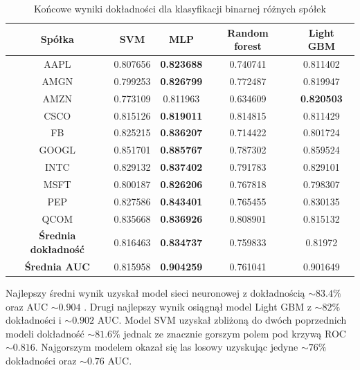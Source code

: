 \documentclass[a4paper, twoside, 11pt, openright]{article}
\begin{document}
 \begin{table}[H]
    \centering
    \begin{tabular}{|c|c|c|c|c|}
    \hline
        \textbf{Spółka} & \textbf{SVM} &  \textbf{MLP}  &  \textbf{Random forest}  &  \textbf{Light GBM} \\ \hline
AAPL   &  0.807656 & \textbf{0.823688}  & 0.740741 & 0.811402\\ \hline
AMGN   &  0.799253 &  \textbf{0.826799} &0.772487 &  0.819947 \\ \hline
AMZN   &  0.773109 & 0.811963 & 0.634609 & \textbf{0.820503} \\ \hline
CSCO   &  0.815126 &  \textbf{0.819011} & 0.814815 &  0.811429 \\ \hline
FB     &  0.825215 & \textbf{0.836207} & 0.714422 & 0.801724 \\ \hline
GOOGL  &  0.851701 &  \textbf{0.885767} & 0.787302 & 0.859524 \\ \hline
INTC   &  0.829132 & \textbf{0.837402}  & 0.791783 & 0.829101 \\ \hline
MSFT   &  0.800187 &   \textbf{0.826206} & 0.767818 &  0.798307\\ \hline
PEP    &  0.827586 & \textbf{0.843401}  & 0.765455 & 0.830135 \\ \hline
QCOM   &  0.835668 &  \textbf{0.836926} & 0.808901 & 0.815132 \\ \hline \hline
\textbf{Średnia dokładność} &  0.816463 & \textbf{0.834737} & 0.759833 & 0.81972 \\  \hline  
\textbf{Średnia AUC} &  0.815958 & \textbf{0.904259} & 0.761041 & 0.901649 \\  \hline
    \end{tabular}
    \caption{Końcowe wyniki dokładności dla klasyfikacji binarnej różnych spółek}
    \label{tab:comparison_final_binary}
\end{table}   

Najlepszy średni wynik uzyskał model sieci neuronowej z dokładnością $\sim 83.4\%$ oraz AUC $\sim 0.904$ . Drugi najlepszy wynik osiągnął model Light GBM z  $\sim 82\%$ dokładności i $\sim 0.902$ AUC. Model SVM uzyskał zbliżoną do dwóch poprzednich modeli dokładność $\sim 81.6\%$ jednak ze znacznie gorszym polem pod krzywą ROC $\sim 0.816$. Najgorszym modelem okazał się las losowy uzyskując jedyne $\sim 76\%$ dokładności oraz $\sim 0.76$ AUC.

\bigskip
\end{document}
